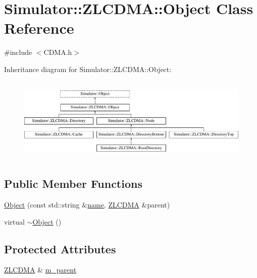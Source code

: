 \hypertarget{class_simulator_1_1_z_l_c_d_m_a_1_1_object}{\section{Simulator\+:\+:Z\+L\+C\+D\+M\+A\+:\+:Object Class Reference}
\label{class_simulator_1_1_z_l_c_d_m_a_1_1_object}
}


{\ttfamily \#include $<$C\+D\+M\+A.\+h$>$}

Inheritance diagram for Simulator\+:\+:Z\+L\+C\+D\+M\+A\+:\+:Object\+:\begin{figure}[H]
\begin{center}
\leavevmode
\includegraphics[height=4.093567cm]{class_simulator_1_1_z_l_c_d_m_a_1_1_object}
\end{center}
\end{figure}
\subsection*{Public Member Functions}
\begin{DoxyCompactItemize}
\item 
\hyperlink{class_simulator_1_1_z_l_c_d_m_a_1_1_object_a274923ea20fe16bee2c01a7a1cad93b1}{Object} (const std\+::string \&\hyperlink{mtconf_8c_a8f8f80d37794cde9472343e4487ba3eb}{name}, \hyperlink{class_simulator_1_1_z_l_c_d_m_a}{Z\+L\+C\+D\+M\+A} \&parent)
\item 
virtual \hyperlink{class_simulator_1_1_z_l_c_d_m_a_1_1_object_a7f60be9c8cdb8dd0b7fa59b14254b4e0}{$\sim$\+Object} ()
\end{DoxyCompactItemize}
\subsection*{Protected Attributes}
\begin{DoxyCompactItemize}
\item 
\hyperlink{class_simulator_1_1_z_l_c_d_m_a}{Z\+L\+C\+D\+M\+A} \& \hyperlink{class_simulator_1_1_z_l_c_d_m_a_1_1_object_a749358a54d455b727ed7043a582560fa}{m\+\_\+parent}
\end{DoxyCompactItemize}


